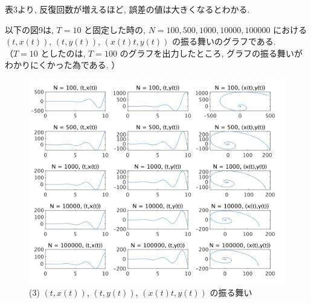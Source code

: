 \documentclass[11pt]{jsarticle}
\begin{document}
表3より, 反復回数が増えるほど, 誤差の値は大きくなるとわかる. \par
以下の図9は, $T = 10$ と固定した時の, $N = 100, 500, 1000, 10000, 100000$ における $(t, x(t))$, $(t, y(t))$, $(x(t)t, y(t))$ の振る舞いのグラフである. \\
（$T = 10$ としたのは, $T = 100$ のグラフを出力したところ, グラフの振る舞いがわかりにくかった為である. ）
\begin{figure}[htbp]
\centering
\includegraphics[width=15cm]{images/3_matlab.png}
\caption{(3) $(t, x(t))$, $(t, y(t))$, $(x(t)t, y(t))$ の振る舞い}
\end{figure}

\clearpage

\end{document}
